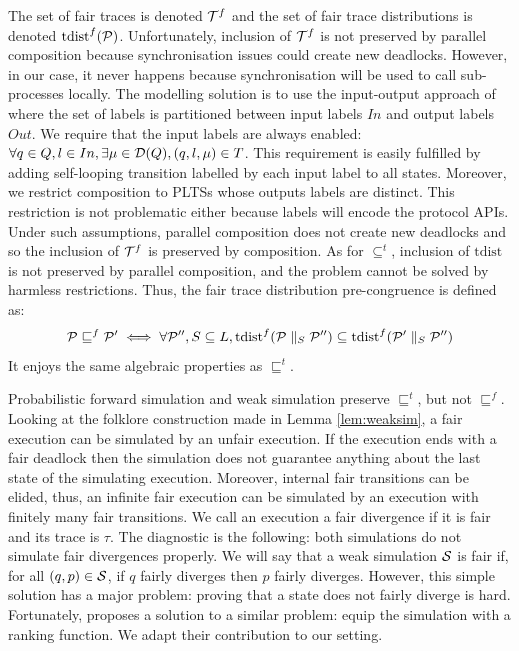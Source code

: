 The set of fair traces is denoted $\mathcal{T}^f$ and the set of fair trace distributions is denoted 
$\text{tdist}^f(\mathcal{P})$. Unfortunately, inclusion of $\mathcal{T}^f$ is not preserved by parallel
composition because synchronisation issues could create new deadlocks. However, in our case, it 
never happens because synchronisation will be used to call sub-processes locally. The modelling 
solution is to use the input-output approach of \cite{InputOutput} where the set of 
labels is partitioned between input labels $In$ and output labels $Out$. We require that the input 
labels are always enabled: $\forall q \in Q, l \in In, \exists \mu \in \mathcal{D}(Q), (q,l,\mu) \in T$. 
This requirement is easily fulfilled by adding self-looping transition labelled by each input label
to all states. Moreover, we restrict composition to PLTSs whose outputs labels are distinct. This 
restriction is not problematic either because labels will encode the protocol APIs. Under such 
assumptions, parallel composition does not create new deadlocks and so the inclusion of $\mathcal{T}^f$ 
is preserved by composition. As for $\subseteq^t$, inclusion of $\text{tdist}$ is not preserved by 
parallel composition, and the problem cannot be solved by harmless restrictions. Thus, the fair 
trace distribution pre-congruence is defined as: 
\[
    \mathcal{P} \sqsubseteq^f \mathcal{P}' \iff \forall \mathcal{P}'', S \subseteq L, \text{tdist}^f(\mathcal{P} \parallel_S \mathcal{P}'') \subseteq  \text{tdist}^f(\mathcal{P}' \parallel_S \mathcal{P}'') 
\]
It enjoys the same algebraic properties as $\sqsubseteq^t$.

Probabilistic forward simulation and weak simulation preserve $\sqsubseteq^t$, but not 
$\sqsubseteq^f$. Looking at the folklore construction made in Lemma \ref{lem:weaksim}, a fair 
execution can be simulated by an unfair execution. If the execution ends with a fair deadlock then
the simulation does not guarantee anything about the last state of the simulating execution.
Moreover, internal fair transitions can be elided, thus, an infinite fair execution can be simulated
by an execution with finitely many fair transitions. We call an execution a fair divergence if it is
fair and its trace is $\tau$. The diagnostic is the following: both simulations do not simulate
fair divergences properly. We will say that a weak simulation $\mathcal{S}$ is fair if, for all $(q,p) 
\in \mathcal{S}$, if $q$ fairly diverges then $p$ fairly diverges. However, this simple solution has a
major problem: proving that a state does not fairly diverge is hard. Fortunately, 
\cite{Dongol2022Weak} proposes a solution to a similar problem: equip the simulation with a ranking
function. We adapt their contribution to our setting. 

